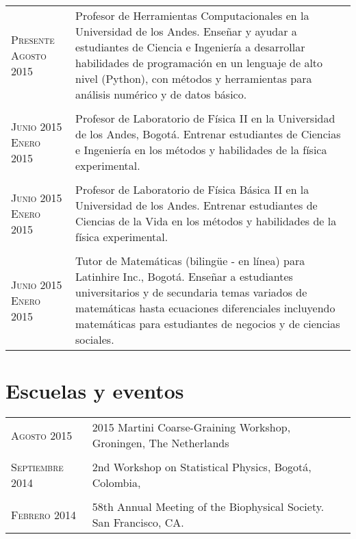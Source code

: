 \documentclass[a4paper,10pt]{article} %
\begin{document}
\begin{longtable}{p{2.2cm}p{12.5cm}}
\textsc{Presente} \newline \textsc{Agosto 2015} & Profesor de Herramientas Computacionales en la Universidad de los Andes. \newline Enseñar y ayudar a estudiantes de Ciencia e Ingeniería a desarrollar habilidades 
de programación en un lenguaje de alto nivel (Python), con métodos y  
herramientas para análisis numérico y de datos básico.  \\
\\
\textsc{Junio 2015} \newline \textsc{Enero 2015} & Profesor de Laboratorio de Física II en la Universidad de los Andes, Bogot\'a. \newline Entrenar estudiantes de Ciencias e Ingeniería en los métodos y 
 habilidades de la física experimental.\\
\\
\textsc{Junio 2015} \newline \textsc{Enero 2015} & Profesor de Laboratorio de Física Básica II en la Universidad de los Andes. \newline Entrenar estudiantes de Ciencias de la Vida en los métodos y habilidades 
de la física experimental.\\
\\
\textsc{Junio 2015} \newline \textsc{Enero 2015} & Tutor de Matemáticas (bilingüe - en línea) para Latinhire Inc., Bogot\'a. \newline Enseñar a estudiantes universitarios y de secundaria temas variados de 
 matemáticas hasta ecuaciones diferenciales incluyendo matemáticas 
 para estudiantes de negocios y de ciencias sociales.
\end{longtable}


\color{OrangeRed}
\section{Escuelas y eventos}
\color{black}

\begin{tabular}{ll}
\textsc{Agosto 2015} & 2015 Martini Coarse-Graining Workshop, Groningen, The Netherlands \\
\\
\textsc{Septiembre 2014} &  2nd Workshop on Statistical Physics, Bogotá, Colombia, \\
\\
\textsc{Febrero 2014} &  58th Annual Meeting of the Biophysical Society. San Francisco, CA. \\
\end{tabular}
\end{document}
